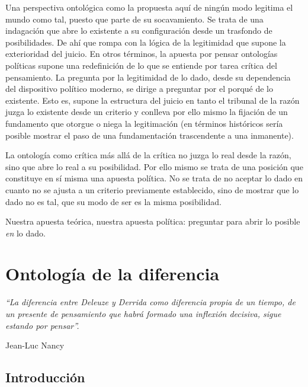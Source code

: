 Una perspectiva ontológica como la propuesta aquí de ningún modo legitima el mundo como tal, puesto que parte de su socavamiento. Se trata de una indagación que abre lo existente a su configuración desde un trasfondo de posibilidades. De ahí que rompa con la lógica de la legitimidad que supone la exterioridad del juicio. En otros términos, la apuesta por pensar ontologías políticas supone una redefinición de lo que se entiende por tarea crítica del pensamiento. La pregunta por la legitimidad de lo dado, desde su dependencia del dispositivo político moderno, se dirige a preguntar por el porqué de lo existente. Esto es, supone la estructura del juicio en tanto el tribunal de la razón juzga lo existente desde un criterio y conlleva por ello mismo la fijación de un fundamento que otorgue o niega la legitimación (en términos históricos sería posible mostrar el paso de una fundamentación trascendente a una inmanente).

La ontología como crítica más allá de la crítica no juzga lo real desde la razón, sino que abre lo real a su posibilidad. Por ello mismo se trata de una posición que constituye en sí misma una apuesta política. No se trata de no aceptar lo dado en cuanto no se ajusta a un criterio previamente establecido, sino de mostrar que lo dado no es tal, que su modo de ser es la misma posibilidad.

Nuestra apuesta teórica, nuestra apuesta política: preguntar para abrir lo posible \emph{en} lo dado.



\mainmatter

\chapter[\textbf{Emmanuel Biset}\\ Ontología de la diferencia]{Ontología de la diferencia}

\epigraph{\emph{\enquote{La diferencia entre Deleuze y Derrida como diferencia propia  de un tiempo, de un presente de pensamiento que habrá formado una inflexión decisiva, sigue estando por pensar}.}}{Jean-Luc Nancy}

\section{Introducción}

